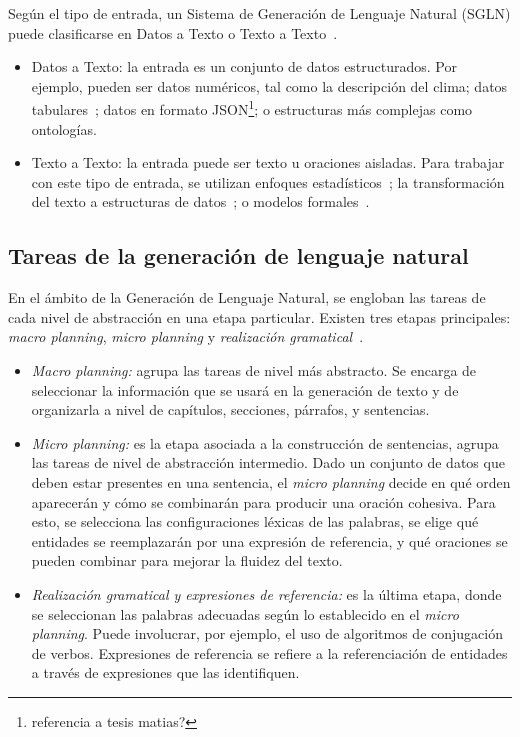 Según el tipo de entrada, un Sistema de Generación de Lenguaje Natural (SGLN) puede clasificarse en Datos a Texto o Texto a Texto~\cite{vicente2015generacion}.
\begin{itemize}
    \item Datos a Texto: la entrada es un conjunto de datos estructurados. Por ejemplo, pueden ser datos numéricos, tal como la descripción del clima; datos  tabulares~\cite{mahapatra2016statistical}; datos en formato JSON\footnote{referencia a tesis matias?}; o estructuras más complejas como ontologías.
    \item Texto a Texto: la entrada puede ser texto u oraciones aisladas. Para trabajar con este tipo de entrada, se utilizan enfoques estadísticos~\cite{mittal1999ultra}; la transformación del texto a estructuras de datos~\cite{saldanha2004creation}; o modelos formales~\cite{guo2018long}.
\end{itemize}

\subsection{Tareas de la generación de lenguaje natural}
En el ámbito de la Generación de Lenguaje Natural, se engloban las tareas de cada nivel de abstracción en una etapa particular. Existen tres etapas principales: \emph{macro planning}, \emph{micro planning} y \emph{realización gramatical}~\cite{vicente2015generacion}.

\begin{itemize}
    \item  \emph{Macro planning:} agrupa las tareas de nivel más abstracto. Se encarga de seleccionar la información que se usará en la generación de texto y de organizarla a nivel de capítulos, secciones, párrafos, y sentencias.
    \item \emph{Micro planning:} es la etapa asociada a la construcción de sentencias, agrupa las tareas de nivel de abstracción intermedio. Dado un conjunto de datos que deben estar presentes en una sentencia, el \emph{micro planning} decide en qué orden aparecerán y cómo se combinarán para producir una oración cohesiva. 
    Para esto, se selecciona las configuraciones léxicas de las palabras, se elige qué entidades se reemplazarán por una expresión de referencia, y qué oraciones se pueden combinar para mejorar la fluidez del texto.
    \item \emph{Realización gramatical y expresiones de referencia:} es la última etapa, donde se seleccionan las palabras adecuadas según lo establecido en el \emph{micro planning}. Puede involucrar, por ejemplo, el uso de algoritmos de conjugación de verbos. Expresiones de referencia se refiere a la referenciación de entidades a través de expresiones que las identifiquen.
\end{itemize}

